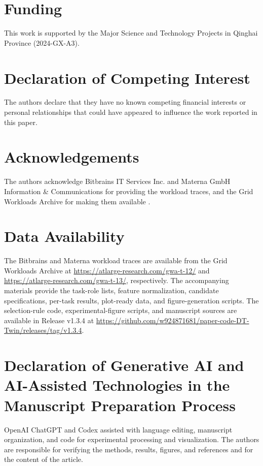 \documentclass[a4paper,fleqn]{cas-sc}
\begin{document}
\section*{Funding}
This work is supported by the Major Science and Technology Projects in Qinghai
Province (2024-GX-A3).

\section*{Declaration of Competing Interest}
The authors declare that they have no known competing financial interests
or personal relationships that could have appeared to influence the work
reported in this paper.

\section*{Acknowledgements}
The authors acknowledge Bitbrains IT Services Inc. and Materna GmbH Information
\& Communications for providing the workload traces, and the Grid Workloads
Archive for making them available \cite{refBitbrains,refGWA,refMaterna}.

\section*{Data Availability}
The Bitbrains and Materna workload traces are available from the Grid
Workloads Archive at \url{https://atlarge-research.com/gwa-t-12/} and
\url{https://atlarge-research.com/gwa-t-13/}, respectively. The accompanying materials
provide the task-role lists, feature normalization, candidate specifications,
per-task results, plot-ready data, and figure-generation scripts.
The selection-rule code, experimental-figure scripts, and manuscript sources
are available in Release v1.3.4 at
\url{https://github.com/w924871681/paper-code-DT-Twin/releases/tag/v1.3.4}.

\section*{Declaration of Generative AI and AI-Assisted Technologies
in the Manuscript Preparation Process}
OpenAI ChatGPT and Codex assisted with language editing, manuscript
organization, and code for experimental processing and visualization.
The authors are responsible for verifying the methods, results, figures,
and references and for the content of the article.
\end{document}
